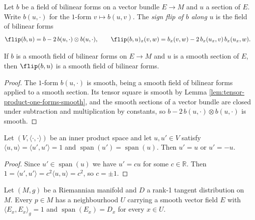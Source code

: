 \begin{definition}
\label{def:sign-flipped-form}
\leanok
{}
Let $b$ be a field of bilinear forms on a vector bundle $E \to M$ and $u$ a section of $E$. Write $b(u,\cdot)$ for the $1$-form $v \mapsto b(u,v)$. The \emph{sign flip of $b$ along $u$} is the field of bilinear forms
\[
  \flip(b,u) = b - 2\, b(u,\cdot) \otimes b(u,\cdot), \qquad \flip(b,u)_x(v,w) = b_x(v,w) - 2\,b_x(u_x,v)\,b_x(u_x,w).
\]
\end{definition}

\begin{lemma}
\label{lem:sign-flipped-form-smooth}
\leanok
{}
If $b$ is a smooth field of bilinear forms on $E \to M$ and $u$ is a smooth section of $E$, then $\flip(b,u)$ is a smooth field of bilinear forms.
\end{lemma}

\begin{proof}
\leanok
{}
The $1$-form $b(u,\cdot)$ is smooth, being a smooth field of bilinear forms applied to a smooth section. Its tensor square is smooth by Lemma \ref{lem:tensor-product-one-forms-smooth}, and the smooth sections of a vector bundle are closed under subtraction and multiplication by constants, so $b - 2\,b(u,\cdot)\otimes b(u,\cdot)$ is smooth.
\end{proof}

\begin{lemma}
\label{lem:two-unit-vectors-of-a-line}
\leanok
Let $(V, \langle\cdot,\cdot\rangle)$ be an inner product space and let $u, u' \in V$ satisfy $\langle u,u\rangle = \langle u',u'\rangle = 1$ and $\operatorname{span}(u') = \operatorname{span}(u)$. Then $u' = u$ or $u' = -u$.
\end{lemma}

\begin{proof}
\leanok
Since $u' \in \operatorname{span}(u)$ we have $u' = cu$ for some $c \in \mathbb{R}$. Then $1 = \langle u',u'\rangle = c^2\langle u,u\rangle = c^2$, so $c = \pm 1$.
\end{proof}

\begin{lemma}
\label{lem:local-unit-section}
\leanok
{}
Let $(M,g)$ be a Riemannian manifold and $D$ a rank-1 tangent distribution on $M$. Every $p \in M$ has a neighbourhood $U$ carrying a smooth vector field $E$ with $\langle E_x, E_x\rangle_g = 1$ and $\operatorname{span}(E_x) = D_x$ for every $x \in U$.
\end{lemma}

